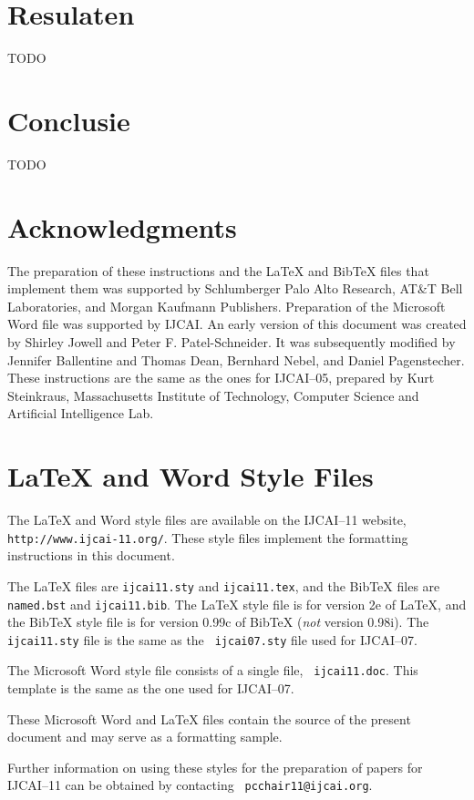 \documentclass{article}
\begin{document}
\section{Resulaten}
TODO

\section{Conclusie}
TODO

\section*{Acknowledgments}

The preparation of these instructions and the \LaTeX{} and Bib\TeX{}
files that implement them was supported by Schlumberger Palo Alto
Research, AT\&T Bell Laboratories, and Morgan Kaufmann Publishers.
Preparation of the Microsoft Word file was supported by IJCAI.  An
early version of this document was created by Shirley Jowell and Peter
F. Patel-Schneider.  It was subsequently modified by Jennifer
Ballentine and Thomas Dean, Bernhard Nebel, and Daniel Pagenstecher.
These instructions are the same as the ones for IJCAI--05, prepared by
Kurt Steinkraus, Massachusetts Institute of Technology, Computer
Science and Artificial Intelligence Lab.

\appendix

\section{\LaTeX{} and Word Style Files}\label{stylefiles}

The \LaTeX{} and Word style files are available on the IJCAI--11
website, {\tt http://www.ijcai-11.org/}.
These style files implement the formatting instructions in this
document.

The \LaTeX{} files are {\tt ijcai11.sty} and {\tt ijcai11.tex}, and
the Bib\TeX{} files are {\tt named.bst} and {\tt ijcai11.bib}. The
\LaTeX{} style file is for version 2e of \LaTeX{}, and the Bib\TeX{}
style file is for version 0.99c of Bib\TeX{} ({\em not} version
0.98i). The {\tt ijcai11.sty} file is the same as the {\tt
ijcai07.sty} file used for IJCAI--07.

The Microsoft Word style file consists of a single file, {\tt
ijcai11.doc}. This template is the same as the one used for
IJCAI--07.

These Microsoft Word and \LaTeX{} files contain the source of the
present document and may serve as a formatting sample.  

Further information on using these styles for the preparation of
papers for IJCAI--11 can be obtained by contacting {\tt
pcchair11@ijcai.org}.



\end{document}
